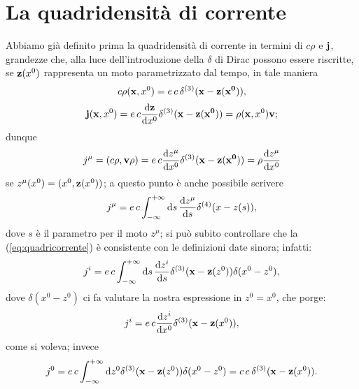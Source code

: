 \section{ La quadridensit\`a di corrente}
Abbiamo gi\`a definito prima la quadridensit\`a di corrente in termini
di $c\rho$ e $\mathbf{j}$, grandezze che, alla luce dell'introduzione
della $\delta$ di Dirac possono essere riscritte, se $\mathbf{z}(x^0)$
rappresenta un moto parametrizzato dal tempo, in tale maniera
$$
c\rho (\mathbf{x},x^0)= e \, c \, \delta^{(3)}(\mathbf{x-z(x^0)}),
$$
$$
\mathbf{j} (\mathbf{x},x^0) = e\,c \frac{\mathrm{d} \mathbf{z}}{\mathrm{d} x^0}
\delta^{(3)}(\mathbf{x-z(x^0)}) = \rho (\mathbf{x},x^0) \mathbf{v};
$$
dunque
$$
j^{\mu} = (c\rho,\mathbf{v} \rho) = e\,c \frac{\mathrm{d} z^{\mu}}{\mathrm{d} x^0}
\delta^{(3)}(\mathbf{x-z(x^0)}) = \rho \frac{\mathrm{d} z^{\mu}}{\mathrm{d} x^0}
$$
se $z^{\mu}(x^0) = (x^0 , \mathbf{z}(x^0))$; a questo punto \`e anche
possibile scrivere
\begin{equation}
  j^{\mu} = e\,c\int_{-\infty}^{+\infty} \mathrm{d} s \,\frac{\mathrm{d}
    z^{\mu}}{\mathrm{d} s} \delta^{(4)}(x-z(s)), \label{eq:quadricorrente}
\end{equation}
dove $s$ \`e il parametro per il moto $z^{\mu}$; si pu\`o subito
controllare che la (\ref{eq:quadricorrente}) \`e consistente con le
definizioni date sinora; infatti:
$$
j^{i} = e\,c \int_{-\infty}^{+\infty} \mathrm{d} s \,\frac{\mathrm{d} z^{i}}{\mathrm{d} s}
\delta^{(3)}(\mathbf{x-z}(z^0))\delta(x^0 - z^0),
$$
dove $\delta(x^0 - z^0)$ ci fa valutare la nostra espressione in $z^0
= x^0$, che porge:
$$
j^{i} = e\,c \frac{\mathrm{d} z^i}{\mathrm{d} x^0}\delta^{(3)}(\mathbf{x-z}(x^0)),
$$
come si voleva; invece
$$
j^{0} = e\,c \int_{-\infty}^{+\infty} \mathrm{d} z^0
\delta^{(3)}(\mathbf{x-z}(z^0))\delta(x^0 - z^0) =
c\,e\,\delta^{(3)}(\mathbf{x-z}(x^0)).
$$

